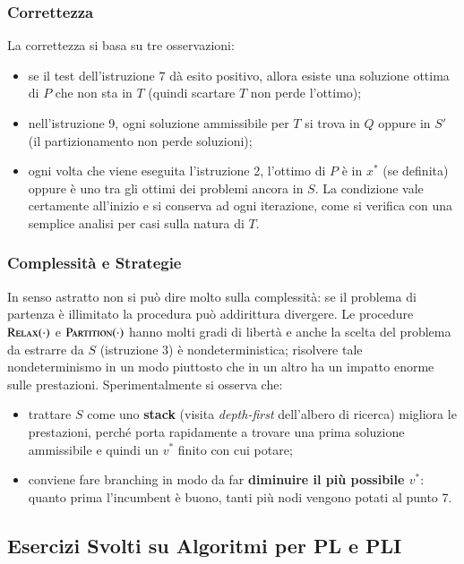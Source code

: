 \documentclass[12pt]{extarticle} %
\begin{document}
\subsubsection{Correttezza}
La correttezza si basa su tre osservazioni:
\begin{itemize}
    \item se il test dell'istruzione 7 dà esito positivo, allora esiste una soluzione ottima di $P$ che non sta in $T$ (quindi scartare $T$ non perde l'ottimo);
    \item nell'istruzione 9, ogni soluzione ammissibile per $T$ si trova in $Q$ oppure in $S'$ (il partizionamento non perde soluzioni);
    \item ogni volta che viene eseguita l'istruzione 2, l'ottimo di $P$ è in $x^*$ (se definita) oppure è uno tra gli ottimi dei problemi ancora in $S$. La condizione vale certamente all'inizio e si conserva ad ogni iterazione, come si verifica con una semplice analisi per casi sulla natura di $T$.
\end{itemize}

\subsubsection{Complessità e Strategie}
In senso astratto non si può dire molto sulla complessità: se il problema di partenza è illimitato la procedura può addirittura divergere. Le procedure $\textsc{Relax}(\cdot)$ e $\textsc{Partition}(\cdot)$ hanno molti gradi di libertà e anche la scelta del problema da estrarre da $S$ (istruzione 3) è nondeterministica; risolvere tale nondeterminismo in un modo piuttosto che in un altro ha un impatto enorme sulle prestazioni. Sperimentalmente si osserva che:
\begin{itemize}
    \item trattare $S$ come uno \textbf{stack} (visita \textit{depth-first} dell'albero di ricerca) migliora le prestazioni, perché porta rapidamente a trovare una prima soluzione ammissibile e quindi un $v^*$ finito con cui potare;
    \item conviene fare branching in modo da far \textbf{diminuire il più possibile $v^*$}: quanto prima l'incumbent è buono, tanti più nodi vengono potati al punto 7.
\end{itemize}


\newpage

\subsection{Esercizi Svolti su Algoritmi per PL e PLI}
\end{document}
